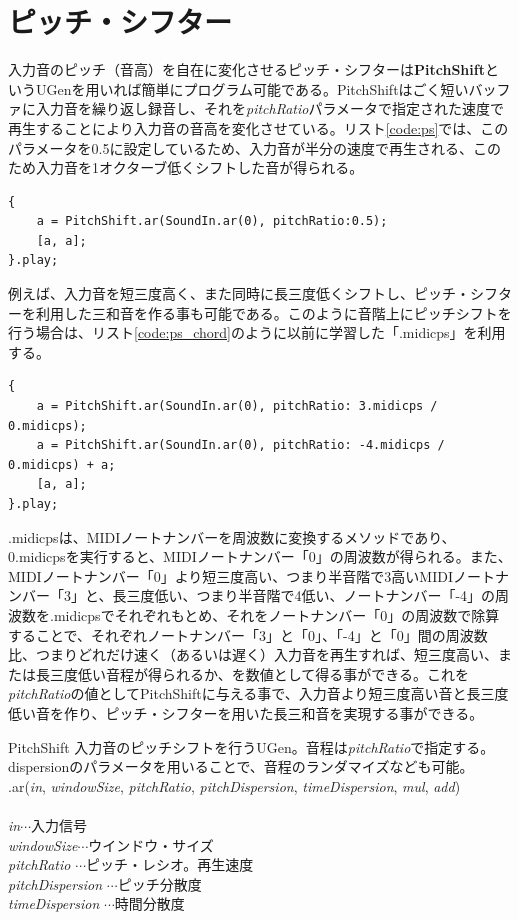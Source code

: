 \documentclass{jsarticle}
\begin{document}
\section{ピッチ・シフター}
入力音のピッチ（音高）を自在に変化させるピッチ・シフターは{\bf PitchShift}というUGenを用いれば簡単にプログラム可能である。PitchShiftはごく短いバッファに入力音を繰り返し録音し、それを{\it pitchRatio}パラメータで指定された速度で再生することにより入力音の音高を変化させている。リスト\ref{code:ps}では、このパラメータを0.5に設定しているため、入力音が半分の速度で再生される、このため入力音を1オクターブ低くシフトした音が得られる。

\begin{lstlisting}[caption=ピッチ・シフター, label=code:ps]
{
	a = PitchShift.ar(SoundIn.ar(0), pitchRatio:0.5);
	[a, a];
}.play;
\end{lstlisting}

例えば、入力音を短三度高く、また同時に長三度低くシフトし、ピッチ・シフターを利用した三和音を作る事も可能である。このように音階上にピッチシフトを行う場合は、リスト\ref{code:ps_chord}のように以前に学習した「.midicps」を利用する。

\begin{lstlisting}[caption=ピッチ・シフターによる和音, label=code:ps_chord]
{
	a = PitchShift.ar(SoundIn.ar(0), pitchRatio: 3.midicps / 0.midicps);
	a = PitchShift.ar(SoundIn.ar(0), pitchRatio: -4.midicps / 0.midicps) + a;
	[a, a];
}.play;
\end{lstlisting}

.midicpsは、MIDIノートナンバーを周波数に変換するメソッドであり、0.midicpsを実行すると、MIDIノートナンバー「0」の周波数が得られる。また、MIDIノートナンバー「0」より短三度高い、つまり半音階で3高いMIDIノートナンバー「3」と、長三度低い、つまり半音階で4低い、ノートナンバー「-4」の周波数を.midicpsでそれぞれもとめ、それをノートナンバー「0」の周波数で除算することで、それぞれノートナンバー「3」と「0」、「-4」と「0」間の周波数比、つまりどれだけ速く（あるいは遅く）入力音を再生すれば、短三度高い、または長三度低い音程が得られるか、を数値として得る事ができる。これを{\it pitchRatio}の値としてPitchShiftに与える事で、入力音より短三度高い音と長三度低い音を作り、ピッチ・シフターを用いた長三和音を実現する事ができる。

\begin{itembox}[l]{PitchShift}
{\footnotesize 
入力音のピッチシフトを行うUGen。音程は{\it pitchRatio}で指定する。dispersionのパラメータを用いることで、音程のランダマイズなども可能。\\
.ar({\it in}, {\it windowSize}, {\it pitchRatio}, {\it pitchDispersion}, {\it timeDispersion}, {\it mul}, {\it add})\\\\
{\it in}$\cdots$入力信号\\
{\it windowSize}$\cdots$ウインドウ・サイズ\\
{\it pitchRatio} $\cdots$ピッチ・レシオ。再生速度\\
{\it pitchDispersion} $\cdots$ピッチ分散度\\
{\it timeDispersion} $\cdots$時間分散度\\
}
\end{itembox}
\end{document}
